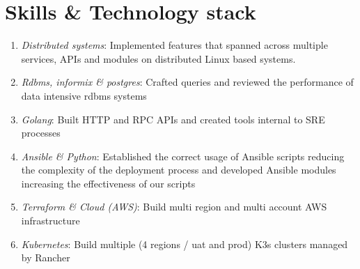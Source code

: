 \documentclass{CVSoftwareEngineer}
\begin{document}
\begin{paracol}{2}
	\end{paracol}

	\section{Skills \& Technology stack}
	\begin{enumerate}[labelwidth=!, labelindent=0pt, leftmargin=*, rightmargin=15pt]
		\itemsep0em
		\item[\textasteriskcentered] \textit{Distributed systems}: Implemented features that spanned across multiple services,
			APIs and modules on distributed Linux based systems.
		\item[\textasteriskcentered] \textit{Rdbms, informix \& postgres}: Crafted queries and reviewed the performance of data
			intensive rdbms systems
		\item[\textasteriskcentered] \textit{Golang}: Built HTTP and RPC APIs and created tools internal to SRE processes
		\item[\textasteriskcentered] \textit{Ansible \& Python}: Established the correct usage of Ansible scripts reducing the complexity
			of the deployment process and developed Ansible modules increasing the effectiveness of our scripts
		\item[\textasteriskcentered] \textit{Terraform \& Cloud (AWS)}: Build multi region and multi account AWS infrastructure
		\item[\textasteriskcentered] \textit{Kubernetes}: Build multiple (4 regions / uat and prod) K3s clusters managed by Rancher
	\end{enumerate}
\end{document}
